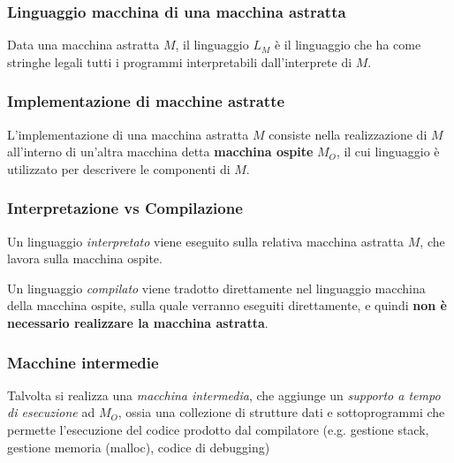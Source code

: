 \documentclass[a4paper,10pt]{article}
\begin{document}
\subsubsection{Linguaggio macchina di una macchina astratta}
Data una macchina astratta $M$, il linguaggio $L_M$ è il linguaggio che ha come stringhe legali tutti i programmi interpretabili dall'interprete di $M$.

\subsubsection{Implementazione di macchine astratte}
L'implementazione di una macchina astratta $M$ consiste nella realizzazione di $M$ all'interno di un'altra macchina detta \textbf{macchina ospite} $M_O$, il cui linguaggio è utilizzato per descrivere le componenti di $M$.

\subsubsection{Interpretazione vs Compilazione}
Un linguaggio \emph{interpretato} viene eseguito sulla relativa macchina astratta $M$, che lavora sulla macchina ospite.\smallskip

Un linguaggio \emph{compilato} viene tradotto direttamente nel linguaggio macchina della macchina ospite, sulla quale verranno eseguiti direttamente, e quindi \textbf{non è necessario realizzare la macchina astratta}.

\subsubsection{Macchine intermedie}
Talvolta si realizza una \emph{macchina intermedia}, che aggiunge un \emph{supporto a tempo di esecuzione} ad $M_O$, ossia una collezione di strutture dati e sottoprogrammi che permette l'esecuzione del codice prodotto dal compilatore (e.g. gestione stack, gestione memoria (malloc), codice di debugging)
\end{document}
